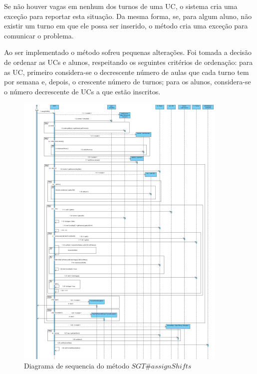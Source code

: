 \documentclass[12pt,a4paper]{report}
\begin{document}
Se não houver vagas em nenhum dos turnos de uma UC, o sistema cria uma exceção para reportar esta situação. Da mesma forma, se, para algum aluno, não existir um turno em que ele possa ser inserido, o método cria uma exceção para comunicar o problema.

Ao ser implementado o método sofreu pequenas alterações. Foi tomada a decisão de ordenar as UCs e alunos, respeitando os seguintes critérios de ordenação:
para as UC, primeiro considera-se o  decrescente número de aulas que cada turno tem por semana e, depois, o crescente número de turnos; para os alunos, considera-se o número decrescente de UCs a que estão inscritos.
\begin{figure}[H]
	\centering 
	\includegraphics[width=0.9\textwidth]{modelacao/diagramas_de_sequencia/assignShifts/assignShifts.png}
	\caption{Diagrama de sequencia do método $SGT\#assignShifts$}
	\label{fig:assignShifts}
\end{figure}
\end{document}
